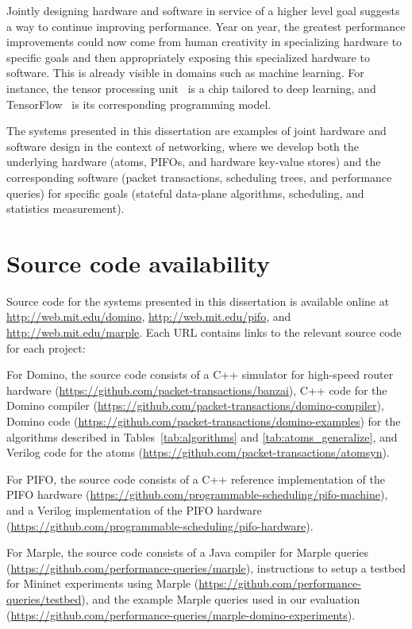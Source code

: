 Jointly designing hardware and software in service of a higher level goal
suggests a way to continue improving performance. Year on year, the greatest
performance improvements could now come from human creativity in specializing
hardware to specific goals and then appropriately exposing this specialized
hardware to software. This is already visible in domains such as machine
learning. For instance, the tensor processing unit~\cite{tpu} is a chip
tailored to deep learning, and TensorFlow~\cite{tensorflow} is its
corresponding programming model.

The systems presented in this dissertation are examples of joint hardware and
software design in the context of networking, where we develop both the
underlying hardware (atoms, PIFOs, and hardware key-value stores) and the
corresponding software (packet transactions, scheduling trees, and performance
queries) for specific goals (stateful data-plane algorithms, scheduling, and
statistics measurement).

\section{Source code availability}
Source code for the systems presented in this dissertation is available online
at \url{http://web.mit.edu/domino}, \url{http://web.mit.edu/pifo}, and
\url{http://web.mit.edu/marple}. Each URL contains links to the relevant source code for each project:
\begin{CompactEnumerate}
\item For Domino, the source code consists of a C++ simulator for high-speed router hardware (\url{https://github.com/packet-transactions/banzai}), C++ code for the Domino compiler (\url{https://github.com/packet-transactions/domino-compiler}), Domino code (\url{https://github.com/packet-transactions/domino-examples}) for the algorithms described in Tables~\ref{tab:algorithms} and \ref{tab:atoms_generalize}, and Verilog code for the atoms (\url{https://github.com/packet-transactions/atomsyn}).
\item For PIFO, the source code consists of a C++ reference implementation of the PIFO hardware (\url{https://github.com/programmable-scheduling/pifo-machine}), and a Verilog implementation of the PIFO hardware (\url{https://github.com/programmable-scheduling/pifo-hardware}).
\item For Marple, the source code consists of a Java compiler for Marple queries (\url{https://github.com/performance-queries/marple}), instructions to setup a testbed for Mininet experiments using Marple (\url{https://github.com/performance-queries/testbed}), and the example Marple queries used in our evaluation (\url{https://github.com/performance-queries/marple-domino-experiments}).
\end{CompactEnumerate}


